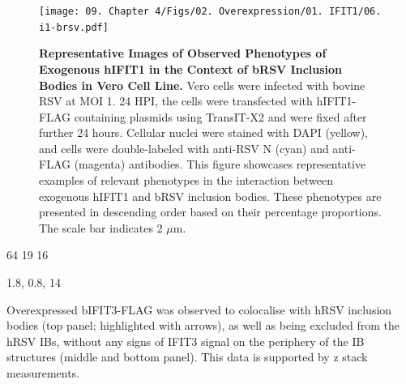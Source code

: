 \begin{figure}
    \centering
    \texttt{[image: 09. Chapter 4/Figs/02. Overexpression/01. IFIT1/06. i1-brsv.pdf]}
    \caption[Representative Images of Observed Phenotypes of Exogenous hIFIT1 in the Context of bRSV Inclusion Bodies in Vero Cell Line.]{\textbf{Representative Images of Observed Phenotypes of Exogenous hIFIT1 in the Context of bRSV Inclusion Bodies in Vero Cell Line.} Vero cells were infected with bovine RSV at MOI 1. 24 HPI, the cells were transfected with hIFIT1-FLAG containing plasmids using TransIT-X2 and were fixed after further 24 hours. Cellular nuclei were stained with DAPI (yellow), and cells were double-labeled with anti-RSV N (cyan) and anti-FLAG (magenta) antibodies. This figure showcases representative examples of relevant phenotypes in the interaction between exogenous hIFIT1 and bRSV inclusion bodies. These phenotypes are presented in descending order based on their percentage proportions. The scale bar indicates 2 \(\mu \mbox{m}\).}
    \label{fig:Representative Images of Observed Phenotypes of Exogenous hIFIT1 in the Context of bRSV Inclusion Bodies in VERO Cell Line}
\end{figure}

64 19 16

1.8, 0.8, 14

Overexpressed bIFIT3-FLAG was observed to colocalise with hRSV inclusion bodies (top panel; highlighted with arrows), as well as being excluded from the hRSV IBs, without any signs of IFIT3 signal on the periphery of the IB structures (middle and bottom panel). This data is supported by z stack measurements.

